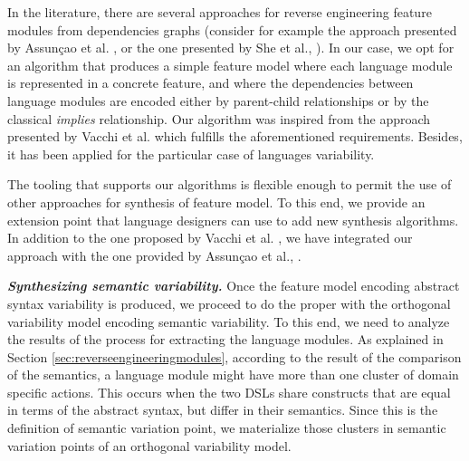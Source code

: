 In the literature, there are several approaches for reverse engineering feature modules from dependencies graphs (consider for example the approach presented by Assun\c{c}ao et al. \cite{Assuncao:2015}, or the one presented by She et al., \cite{She:2014}). In our case, we opt for an algorithm that produces a simple feature model where each language module is represented in a concrete feature, and where the dependencies between language modules are encoded either by parent-child relationships or by the classical \textit{implies} relationship. Our algorithm was inspired from the approach presented by Vacchi et al. \cite{Vacchi:2013} which fulfills the aforementioned requirements. Besides, it has been applied for the particular case of languages variability. 

The tooling that supports our algorithms is flexible enough to permit the use of other approaches for synthesis of feature model. To this end, we provide an extension point that language designers can use to add new synthesis algorithms. In addition to the one proposed by Vacchi et al. \cite{Vacchi:2013}, we have integrated our approach with the one provided by Assun\c{c}ao et al., \cite{Assuncao:2015}.


\vspace{2mm}
\textit{\textbf{Synthesizing semantic variability.}} Once the feature model encoding abstract syntax variability is produced, we proceed to do the proper with the orthogonal variability model encoding semantic variability. To this end, we need to analyze the results of the process for extracting the language modules. As explained in Section \ref{sec:reverseengineeringmodules}, according to the result of the comparison of the semantics, a language module might have more than one cluster of domain specific actions. This occurs when the two DSLs share constructs that are equal in terms of the abstract syntax, but differ in their semantics. Since this is the definition of semantic variation point, we materialize those clusters in semantic variation points of an orthogonal variability model.

